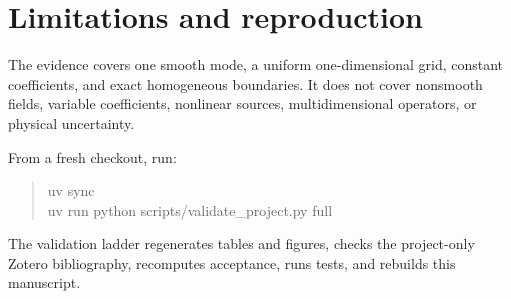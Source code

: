 \documentclass[11pt]{article}
\begin{document}
\section{Limitations and reproduction}

The evidence covers one smooth mode, a uniform one-dimensional grid, constant
coefficients, and exact homogeneous boundaries. It does not cover nonsmooth
fields, variable coefficients, nonlinear sources, multidimensional operators,
or physical uncertainty.

From a fresh checkout, run:
\begin{quote}
\small\ttfamily
uv sync\\
uv run python scripts/validate\_project.py full
\end{quote}
The validation ladder regenerates tables and figures, checks the project-only
Zotero bibliography, recomputes acceptance, runs tests, and rebuilds this
manuscript.



\end{document}
